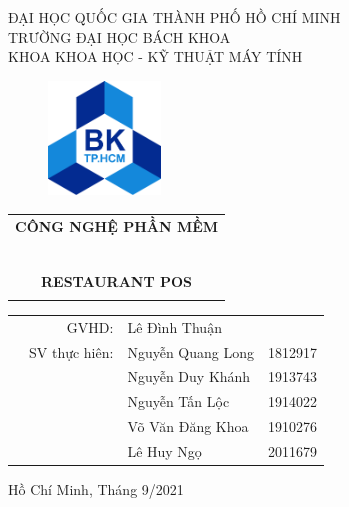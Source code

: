 \documentclass[a4paper]{article}
\begin{document}
\begin{titlepage}
\begin{center}
ĐẠI HỌC QUỐC GIA THÀNH PHỐ HỒ CHÍ MINH \\
TRƯỜNG ĐẠI HỌC BÁCH KHOA \\
KHOA KHOA HỌC - KỸ THUẬT MÁY TÍNH 
\end{center}

\vspace{1cm}

\begin{figure}[h!]
\begin{center}
\includegraphics[width=3cm]{Images/hcmut.png}
\end{center}
\end{figure}

\vspace{1cm}


\begin{center}
\begin{tabular}{c}
\multicolumn{1}{l}{\textbf{{\Large CÔNG NGHỆ PHẦN MỀM}}}\\
~~\\
\hline
\\
\textbf{{\Huge RESTAURANT POS}} \\
\\
\hline
\end{tabular}
\end{center}

\vspace{1.5cm}

\begin{table}[h]
\begin{tabular}{rrll}
\hspace{5 cm} & GVHD: & Lê Đình Thuận & \\
& SV thực hiên: & Nguyễn Quang Long & 1812917 \\
& & Nguyễn Duy Khánh & 1913743 \\
& & Nguyễn Tấn Lộc & 1914022 \\
& & Võ Văn Đăng Khoa & 1910276 \\
&& Lê Huy Ngọ & 2011679
\end{tabular}
\end{table}
\vspace{1.5cm}
\begin{center}
{\footnotesize Hồ Chí Minh, Tháng 9/2021}
\end{center}
\end{titlepage}
\end{document}

